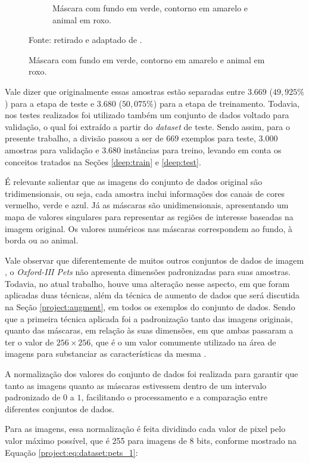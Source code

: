 \begin{figure}[H]
\begin{subfigure}[t]{0.45\textwidth}
        \caption{Máscara com fundo em verde, contorno em amarelo e animal em roxo.}
        \label{project:fig:dataset:pets_1.2}
    \end{subfigure}%

    Fonte: retirado e adaptado de \cite{Parkhi2012CatsDogs}.
\end{figure}


Vale dizer que originalmente essas amostras estão separadas entre $3.669$ ($49,925\%$) para a etapa de teste e $3.680$ ($50,075\%$) para a etapa de treinamento. Todavia, nos testes realizados foi utilizado também um conjunto de dados voltado para validação, o qual foi extraído a partir do \textit{dataset} de teste. Sendo assim, para o presente trabalho, a divisão passou a ser de $669$ exemplos para teste, 3.000 amostras para validação e 3.680 instâncias para treino, levando em conta os conceitos tratados na Seções \ref{deep:train} e \ref{deep:test}.

É relevante salientar que as imagens do conjunto de dados original são tridimensionais, ou seja, cada amostra inclui informações dos canais de cores vermelho, verde e azul. Já as máscaras são unidimensionais, apresentando um mapa de valores singulares para representar as regiões de interesse baseadas na imagem original. Os valores numéricos nas máscaras correspondem ao fundo, à borda ou ao animal.

Vale observar que diferentemente de muitos outros conjuntos de dados de imagem \citep{Bossard2014Food-101Forests}, o \textit{Oxford-III Pets} não apresenta dimensões padronizadas para suas amostras. Todavia, no atual trabalho, houve uma alteração nesse aspecto, em que foram aplicadas duas técnicas, além da técnica de aumento de dados que será discutida na Seção \ref{project:augment}, em todos os exemplos do conjunto de dados. Sendo que a primeira técnica aplicada foi a padronização tanto das imagens originais, quanto das máscaras, em relação às suas dimensões, em que ambas passaram a ter o valor de $256 \times 256$, que é o um valor comumente utilizado na área de imagens para substanciar as características da mesma \citep{Lee1983DigitalFilter}.

A normalização dos valores do conjunto de dados foi realizada para garantir que tanto as imagens quanto as máscaras estivessem dentro de um intervalo padronizado de $0$ a $1$, facilitando o processamento e a comparação entre diferentes conjuntos de dados.

Para as imagens, essa normalização é feita dividindo cada valor de pixel pelo valor máximo possível, que é 255 para imagens de 8 bits, conforme mostrado na Equação \ref{project:eq:dataset:pets_1}:

